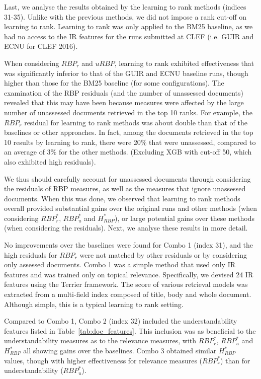 Last, we analyse the results obtained by the learning to rank methods (indices 31-35). Unlike with the previous methods, we did not impose a rank cut-off on learning to rank. Learning to rank was only applied to the BM25 baseline, as we had no access to the IR features for the runs submitted at CLEF (i.e. GUIR and ECNU for CLEF 2016).

When considering $RBP_r$ and $uRBP$, learning to rank exhibited effectiveness that was significantly inferior to that of the GUIR and ECNU baseline runs, though higher than those for the BM25 baseline (for some configurations). The examination of the RBP residuals (and the number of unassessed documents) revealed that this may have been because measures were affected by the large number of unassessed documents retrieved in the top 10 ranks. For example, the $RBP_r$ residual for learning to rank methods was about double than that of the baselines or other approaches. In fact, among the documents retrieved in the top 10 results by learning to rank, there were 20\% that were unassessed, compared to an average of 3\% for the other methods. (Excluding XGB with cut-off 50, which also exhibited high residuals). 


We thus should carefully account for unassessed documents through considering the residuals of RBP measures, as well as the measures that ignore unassessed documents. When this was done, we observed that learning to rank methods overall provided substantial gains over the original runs and other methods (when considering $RBP^*_r$, $RBP^*_u$ and $H_{RBP}^*$), or large potential gains over these methods (when considering the residuals). Next, we analyse these results in more detail. 

No improvements over the baselines were found for Combo 1 (index 31), and the high residuals for $RBP_r$ were not matched by other residuals or by considering only assessed documents. Combo 1 was a simple method that used only IR features and was trained only on topical relevance. Specifically, we devised 24 IR features using the Terrier framework. The score of various retrieval models was extracted from a multi-field index composed of title, body and whole document. Although simple, this is a typical learning to rank setting.

Compared to Combo 1, Combo 2 (index 32) included the understandability features listed in Table~\ref{tab:doc_features}. This inclusion was as beneficial to the understandability measures as to the relevance measures, with $RBP_r^*$, $RBP_u^*$ and $H_{RBP}^*$ all showing gains over the baselines. Combo 3 obtained similar $H_{RBP}^*$ values, though with higher effectiveness for relevance measures ($RBP_r^*$) than for understandability ($RBP_u^*$).

